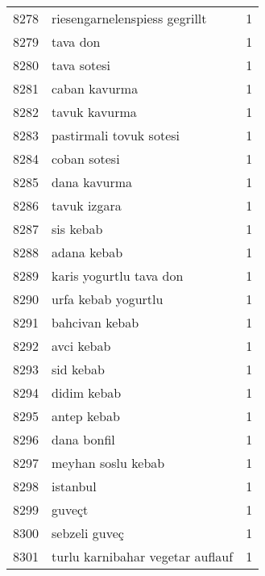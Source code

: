 \begin{tabular}{llr}
8278 &                      riesengarnelenspiess gegrillt &      1 \\
8279 &                                           tava don &      1 \\
8280 &                                        tava sotesi &      1 \\
8281 &                                      caban kavurma &      1 \\
8282 &                                      tavuk kavurma &      1 \\
8283 &                            pastirmali tovuk sotesi &      1 \\
8284 &                                       coban sotesi &      1 \\
8285 &                                       dana kavurma &      1 \\
8286 &                                       tavuk izgara &      1 \\
8287 &                                          sis kebab &      1 \\
8288 &                                        adana kebab &      1 \\
8289 &                            karis yogurtlu tava don &      1 \\
8290 &                                urfa kebab yogurtlu &      1 \\
8291 &                                     bahcivan kebab &      1 \\
8292 &                                         avci kebab &      1 \\
8293 &                                          sid kebab &      1 \\
8294 &                                        didim kebab &      1 \\
8295 &                                        antep kebab &      1 \\
8296 &                                        dana bonfil &      1 \\
8297 &                                 meyhan soslu kebab &      1 \\
8298 &                                           istanbul &      1 \\
8299 &                                             guveçt &      1 \\
8300 &                                      sebzeli guveç &      1 \\
8301 &                   turlu karnibahar vegetar auflauf &      1 \\

\end{tabular}
